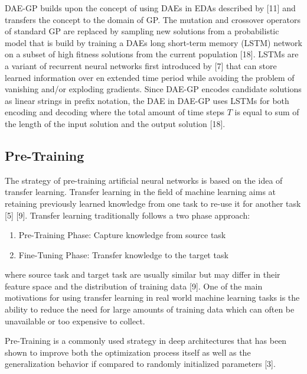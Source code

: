\documentclass[
  11pt,
]{article}
\providecommand{\tightlist}{%
  \setlength{\itemsep}{0pt}\setlength{\parskip}{0pt}}
\begin{document}
DAE-GP builds upon the concept of using DAEs in EDAs described by
{[}11{]} and transfers the concept to the domain of GP. The mutation and
crossover operators of standard GP are replaced by sampling new
solutions from a probabilistic model that is build by training a DAEs
long short-term memory (LSTM) network on a subset of high fitness
solutions from the current population {[}18{]}. LSTMs are a variant of
recurrent neural networks first introduced by {[}7{]} that can store
learned information over en extended time period while avoiding the
problem of vanishing and/or exploding gradients. Since DAE-GP encodes
candidate solutions as linear strings in prefix notation, the DAE in
DAE-GP uses LSTMs for both encoding and decoding where the total amount
of time steps \(T\) is equal to sum of the length of the input solution
and the output solution {[}18{]}.

\hypertarget{pre-training}{%
\subsection{Pre-Training}\label{pre-training}}

The strategy of pre-training artificial neural networks is based on the
idea of transfer learning. Transfer learning in the field of machine
learning aims at retaining previously learned knowledge from one task to
re-use it for another task {[}5{]} {[}9{]}. Transfer learning
traditionally follows a two phase approach:

\begin{enumerate}
\def\labelenumi{\arabic{enumi}.}
\tightlist
\item
  Pre-Training Phase: Capture knowledge from source task
\item
  Fine-Tuning Phase: Transfer knowledge to the target task
\end{enumerate}

where source task and target task are usually similar but may differ in
their feature space and the distribution of training data {[}9{]}. One
of the main motivations for using transfer learning in real world
machine learning tasks is the ability to reduce the need for large
amounts of training data which can often be unavailable or too expensive
to collect.

Pre-Training is a commonly used strategy in deep architectures that has
been shown to improve both the optimization process itself as well as
the generalization behavior if compared to randomly initialized
parameters {[}3{]}.
\end{document}

